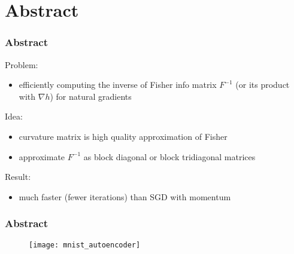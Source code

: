 \section{Abstract}

\begin{frame}
\frametitle{Abstract}

Problem:
\begin{itemize}
    \item efficiently computing the inverse of Fisher info matrix $F^{-1}$
        (or its product with $\nabla h$) for natural gradients
\end{itemize}

Idea:
\begin{itemize}
    \item curvature matrix is high quality approximation of Fisher
    \item approximate $F^{-1}$ as block diagonal or block tridiagonal matrices
\end{itemize}

Result:
\begin{itemize}
    \item much faster (fewer iterations) than SGD with momentum
\end{itemize}

\end{frame}

\begin{frame}
\frametitle{Abstract}

\begin{figure}
    \centering
    \texttt{[image: mnist\_autoencoder]}
\end{figure}

\end{frame}
